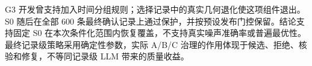 G3 开发曾支持加入时间分组规则；选择记录中的真实几何退化使这项组件退出。S0 随后在全部 600 条最终确认记录上通过保护，并按预设发布门控保留。结论支持固定 S0 在本次条件化范围内恢复覆盖，不支持真实噪声准确率或普遍最优性。最终记录级策略采用确定性参数，实际 A/B/C 治理的作用体现于候选、拒绝、核验和修复，不等同记录级 LLM 带来的质量收益。
